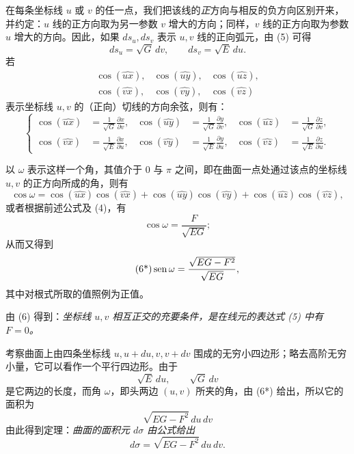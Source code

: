 在每条坐标线 \(u\) 或 \(v\) 的任一点，我们把该线的\emph{正}方向与相反的负方向区别开来，并约定：\(u\) 线的正方向取为另一参数 \(v\) 增大的方向；同样，\(v\) 线的正方向取为参数 \(u\) 增大的方向。因此，如果 \(ds_u,ds_v\) 表示 \(u,v\) 线的正向弧元，由 (5) 可得
\[
 ds_u=\sqrt G\,dv,
 \qquad
 ds_v=\sqrt E\,du.
\]
若
\[
\begin{array}{ccc}
\cos(\widehat{ux}),&\cos(\widehat{uy}),&\cos(\widehat{uz}),\\
\cos(\widehat{vx}),&\cos(\widehat{vy}),&\cos(\widehat{vz})
\end{array}
\]
表示坐标线 \(u,v\) 的（正向）切线的方向余弦，则有：
\begin{equation}\tag{b}
\left\{
\begin{aligned}
\cos(\widehat{ux})&=\frac{1}{\sqrt G}\frac{\partial x}{\partial v},&
\cos(\widehat{uy})&=\frac{1}{\sqrt G}\frac{\partial y}{\partial v},&
\cos(\widehat{uz})&=\frac{1}{\sqrt G}\frac{\partial z}{\partial v},\\[0.4em]
\cos(\widehat{vx})&=\frac{1}{\sqrt E}\frac{\partial x}{\partial u},&
\cos(\widehat{vy})&=\frac{1}{\sqrt E}\frac{\partial y}{\partial u},&
\cos(\widehat{vz})&=\frac{1}{\sqrt E}\frac{\partial z}{\partial u}.
\end{aligned}
\right.
\end{equation}

以 \(\omega\) 表示这样一个角，其值介于 0 与 \(\pi\) 之间，即在曲面一点处通过该点的坐标线 \(u,v\) 的正方向所成的角，则有
\[
\cos\omega=\cos(\widehat{ux})\cos(\widehat{vx})+
\cos(\widehat{uy})\cos(\widehat{vy})+
\cos(\widehat{uz})\cos(\widehat{vz}),
\]
或者根据前述公式及 (4)，有
\begin{equation}\tag{6}
 \cos\omega=\frac{F}{\sqrt{EG}};
\end{equation}
从而又得到
\begin{equation}\tag{6*}
 \operatorname{sen}\omega=\frac{\sqrt{EG-F^2}}{\sqrt{EG}},
\end{equation}
其中对根式所取的值照例为正值。

由 (6) 得到：\emph{坐标线 \(u,v\) 相互正交的充要条件，是在线元的表达式 (5) 中有 \(F=0\)。}

考察曲面上由四条坐标线 \(u,u+du,v,v+dv\) 围成的无穷小四边形；略去高阶无穷小量，它可以看作一个平行四边形。由于
\[
 \sqrt E\,du,
 \qquad
 \sqrt G\,dv
\]
是它两边的长度，而角 \(\omega\)，即头两边 \((u,v)\) 所夹的角，由 (6*) 给出，所以它的面积为
\[
 \sqrt{EG-F^2}\,du\,dv
\]
由此得到定理：\emph{曲面的面积元 \(d\sigma\) 由公式给出}
\[
 d\sigma=\sqrt{EG-F^2}\,du\,dv.
\]

